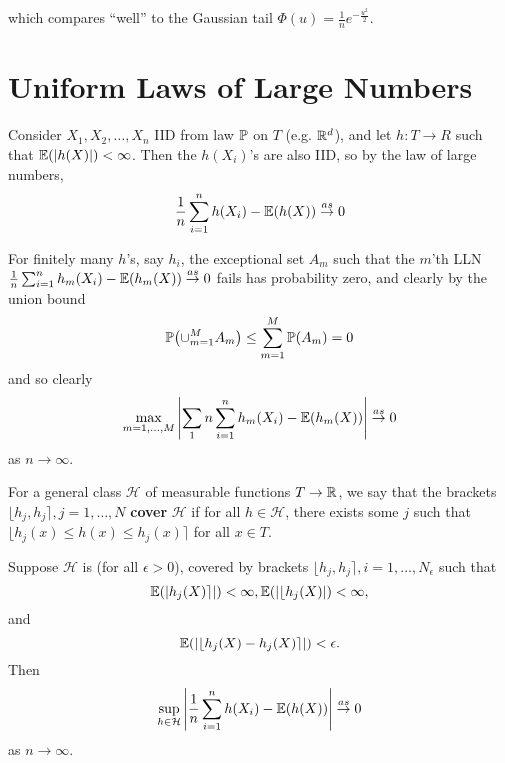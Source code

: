 which compares ``well'' to the Gaussian tail $\Phi(u) = \frac{1}{n}e^{-\frac{u^{2}}{2}}$.


\section{Uniform Laws of Large Numbers}
\label{sec:uniform-laws-large}

Consider $X_{1}, X_{2}, \dots, X_{n}$ IID from law $\Prob$ on $T$
(e.g. $\mathbb{R}^{d}$), and let $h: T \rightarrow R$ such that $\E{|h(X)|} <
\infty$. Then the $h(X_{i})$'s are also IID, so by the law of large
numbers,
\begin{equation}
  \label{eq:23}
  \frac{1}{n} \sum_{i=1}^{n} h(X_{i}) - \E{h(X)} \cas 0
\end{equation}

For finitely many $h$'s, say $h_{i}$, the exceptional set $A_{m}$ such
that the $m$'th LLN $\frac{1}{n} \sum_{i=1}^{n} h_{m}(X_{i}) -
\E{h_{m}(X)} \cas 0$ fails has probability zero, and clearly by the
union bound
\begin{equation}
  \label{eq:24}
  \Prob{\cup_{m=1}^{M} A_{m}} \leq \sum_{m=1}^{M} \Prob{A_{m}} = 0
\end{equation} and so clearly
\begin{equation}
  \label{eq:25}
  \max_{m=1, \dots, M} \left| \sum_{1}{n} \sum_{i=1}^{n} h_{m}(X_{i})
    - \E{h_{m}(X)} \right| \cas 0
\end{equation} as $n \rightarrow \infty$.

For a general class $\mathcal{H}$ of measurable functions $T
\rightarrow \mathbb{R}$, we say that the brackets $\lfloor h_{j}, 
h_{j} \rceil, j = 1, \dots, N$ \textbf{cover} $\mathcal{H}$ if for all
$h \in \mathcal{H}$, there exists some $j$ such that $\lfloor h_{j}(x)
\leq h(x) \leq h_{j}(x) \rceil$ for all $x \in T$.

\begin{proposition}
  Suppose $\mathcal{H}$ is (for all $\epsilon > 0$), covered by
  brackets $\lfloor h_{j}, h_{j} \rceil, i = 1, \dots, N_{\epsilon}$
  such that
  \begin{equation}
    \label{eq:26}
    \E{|h_{j}(X)\rceil|} < \infty, \E{|\lfloor h_{j}(X)|} < \infty,
  \end{equation} and
  \begin{equation}
    \label{eq:27}
    \E{|\lfloor h_{j}(X) - h_{j}(X)\rceil|} < \epsilon.
  \end{equation}  Then
  \begin{equation}
    \label{eq:28}
    \sup_{h \in \mathcal{H}} \left| \frac{1}{n} \sum_{i=1}^{n}
      h(X_{i}) - \E{h(X)} \right| \cas 0
  \end{equation} as $n \rightarrow \infty$.
\end{proposition}

